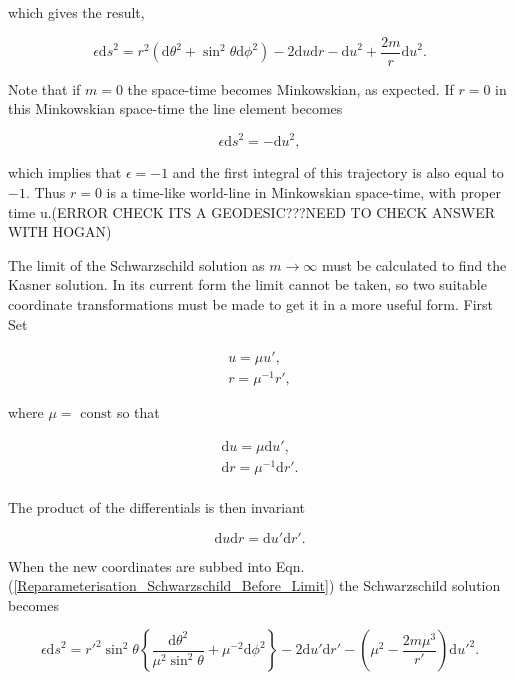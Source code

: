 \noindent which gives the result,

\begin{equation}\label{Reparameterisation_Schwarzschild_Before_Limit}
\epsilon {\mathrm{d}s}^{2} = r^2 ({\mathrm{d}\theta}^2 + {{\sin}^2 \theta}{\mathrm{d} \phi}^2) - 2 \mathrm{d}u \mathrm{d}r - {\mathrm{d}u}^{2} + \frac{2m}{r} {\mathrm{d}u}^{2}. 
\end{equation}

Note that if $m = 0$ the space-time becomes Minkowskian, as expected. If $r = 0$ in this Minkowskian space-time the line element becomes

$$ \epsilon {\mathrm{d}s}^2 = - {\mathrm{d}u}^{2},$$

\noindent which implies that $\epsilon = -1$ and the first integral of this trajectory is also equal to $-1$. Thus $r = 0$ is a time-like world-line in Minkowskian space-time, with proper time u.(ERROR CHECK ITS A GEODESIC???NEED TO CHECK ANSWER WITH HOGAN)

The limit of the Schwarzschild solution as $m \rightarrow \infty$ must be calculated to find the Kasner solution. In its current form the limit cannot be taken, so two suitable coordinate transformations must be made to get it in a more useful form. First Set 

\begin{gather*} 
u = \mu u', \\
r = {\mu}^{-1} r',   
\end{gather*} 

\noindent where $\mu = \text{ const}$ so that
  
\begin{gather*} 
\mathrm{d}u = \mu \mathrm{d}u', \\
\mathrm{d}r = {\mu}^{-1} \mathrm{d}r'. \\
\end{gather*} 

\noindent The product of the differentials is then invariant

\begin{equation*}
{\mathrm{d}u}{\mathrm{d}r} = {\mathrm{d}u'}{\mathrm{d}r'}. 
\end{equation*}

\noindent When the new coordinates are subbed into Eqn.(\ref{Reparameterisation_Schwarzschild_Before_Limit}) the Schwarzschild solution becomes

\begin{equation}\label{Reparameterise_Schwarzschild_Next_Before_Limit}
\epsilon {\mathrm{d}s}^2 = {r'}^2 \sin^2 \theta \left\{ \frac{{\mathrm{d}\theta}^2}{\mu^2 \sin^2 \theta} +  \mu^{-2} {\mathrm{d} \phi}^2 \right\} - 2 {\mathrm{d}u'} {\mathrm{d}r'} - \left( \mu^2 - \frac{2 m \mu^3}{r'}\right) {\mathrm{d}u'}^2 . 
\end{equation}

